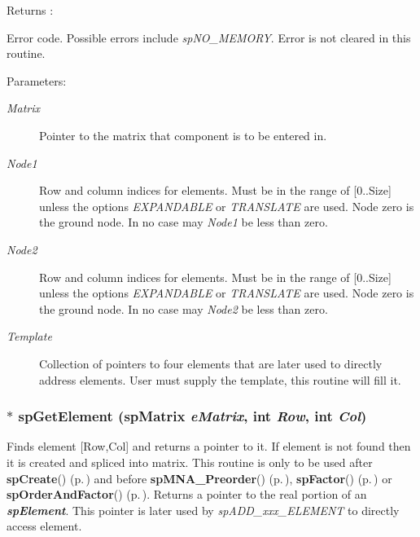 \begin{Desc}
\item[Returns :]\par
 Error code. Possible errors include {\em sp\-NO\_\-MEMORY}. Error is not cleared in this routine.\end{Desc}
\begin{Desc}
\item[Parameters: ]\par
\begin{description}
\item[{\em 
Matrix}]Pointer to the matrix that component is to be entered in. \item[{\em 
Node1}]Row and column indices for elements. Must be in the range of [0..Size] unless the options {\em EXPANDABLE} or {\em TRANSLATE} are used. Node zero is the ground node. In no case may {\em Node1} be less than zero. \item[{\em 
Node2}]Row and column indices for elements. Must be in the range of [0..Size] unless the options {\em EXPANDABLE} or {\em TRANSLATE} are used. Node zero is the ground node. In no case may {\em Node2} be less than zero. \item[{\em 
Template}]Collection of pointers to four elements that are later used to directly address elements. User must supply the template, this routine will fill it. \end{description}
\end{Desc}
\subsubsection{$\ast$ sp\-Get\-Element ({\bf sp\-Matrix} {\em e\-Matrix}, int {\em Row}, int {\em Col})}\label{spBuild_8c_a12}


Finds element [Row,Col] and returns a pointer to it. If element is not found then it is created and spliced into matrix. This routine is only to be used after {\bf sp\-Create}() {\rm (p.\,\pageref{spAllocate_8c_a11})} and before {\bf sp\-MNA\_\-Preorder}() {\rm (p.\,\pageref{spUtils_8c_a11})}, {\bf sp\-Factor}() {\rm (p.\,\pageref{spFactor_8c_a25})} or {\bf sp\-Order\-And\-Factor}() {\rm (p.\,\pageref{spFactor_8c_a24})}. Returns a pointer to the real portion of an {\em {\bf sp\-Element}}. This pointer is later used by {\em sp\-ADD\_\-xxx\_\-ELEMENT} to directly access element.

